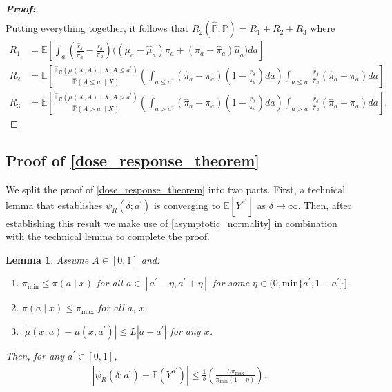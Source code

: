 \documentclass[11pt,twoside]{article}
\newcommand{\E}{\mathbb{E}}
\newtheorem{lemma}{Lemma}
\theoremstyle{definition}
\theoremstyle{remark}
\begin{document}
\begin{proof}[\textbf{Proof:}]
\begin{align*}
\end{align*}
Putting everything together, it follows that $R_2(\widehat{\mathbb{P}}, \mathbb{P}) = R_1 + R_2 + R_3$ where
\begin{align*}
     R_1 &= \mathbb{E} \left[ \int_{a}\left(\frac{\widehat{r}_\delta}{\widehat{\pi}_a} - \frac{r_\delta}{\pi_a} \right)\Big( (\mu_a - \widehat{\mu}_a)\pi_a + (\pi_a - \widehat{\pi}_a) \widehat{\mu}_a \Big) da \right] \\
    R_2 &= \mathbb{E}\left[\frac{\widehat{\mathbb{E}}_R\left(\mu(X, A) \mid X, A \leq a^{\prime} \right)}{\widehat{\mathbb{P}}(A \leq a^{\prime} \mid X)}\left( \int_{a \leq a^{\prime}} (\widehat{\pi}_a - \pi_a)\left( 1 - \frac{r_\delta}{\pi_a} \right)  da \right)\int_{a \leq a^{\prime}} \frac{\widehat{r}_\delta}{\widehat{\pi}_a} (\widehat{\pi}_a - \pi_a) da \right] \\
    R_3 &= \mathbb{E}\left[ \frac{\widehat{\mathbb{E}}_R\left(\mu(X, A) \mid X, A > a^{\prime} \right)}{\widehat{\mathbb{P}}(A > a^{\prime} \mid X)}\left( \int_{a > a^{\prime}} (\widehat{\pi}_a - \pi_a)\left( 1 - \frac{r_\delta}{\pi_a} \right)  da \right)\int_{a > a^{\prime}} \frac{\widehat{r}_\delta}{\widehat{\pi}_a} (\widehat{\pi}_a - \pi_a) da\right].
 \end{align*}
\end{proof}



\subsection{Proof of \texorpdfstring{\cref{dose_response_theorem}}{Theorem 5}} \label{dose_response_theorem_proof}

We split the proof of \cref{dose_response_theorem} into two parts. First, a technical lemma that establishes $\psi_R(\delta; a^\prime)$ is converging to $\mathbb{E}[Y^{a^\prime}]$ as $\delta \to \infty$. Then, after establishing this result we make use of \cref{asymptotic_normality} in combination with the technical lemma to complete the proof.

\begin{lemma} \label{dose_response_lemma}
Assume $A \in [0,1]$ and:
\begin{enumerate}
    \item[(i)] $\pi_{\min} \leq \pi(a \mid x)$ for all $a \in  [a^{\prime} - \eta, a^\prime + \eta]$ for some $\eta \in (0, \text{min}\{a^\prime, 1 - a^\prime\}]$.
    \item[(ii)] $\pi(a \mid x) \leq \pi_{\max}$ for all $a$, $x$.
    \item[(iii)] $|\mu(x,a) - \mu(x,a^{\prime})| \leq L|a-a^{\prime}|$ for any $x$. 
\end{enumerate}
Then, for any $a^\prime \in [0, 1]$,
\begin{align*}
    | \psi_R(\delta; a^\prime) - \E(Y^{a^\prime}) | \leq \frac{1}{\delta} \left( \frac{L \pi_{\max}}{\pi_{\min}(1 - \eta)} \right).
\end{align*}
\end{lemma}
\end{document}
